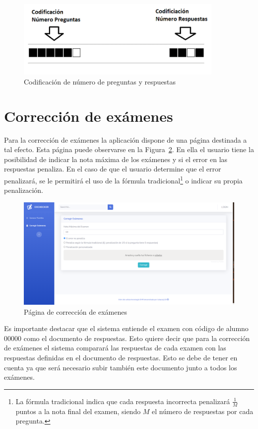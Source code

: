 \documentclass[a4paper, 12pt]{book}
\begin{document}
\begin{figure}
  \centering
  \includegraphics[width=10cm, keepaspectratio]{img/codificaciones}
  \caption{Codificación de número de preguntas y respuestas}
  \label{figura:codificaciones}
\end{figure}

\section{Corrección de exámenes} 
\label{sec:correccion_examenes}

Para la corrección de exámenes la aplicación dispone de una página destinada a tal
efecto. Esta página puede observarse en la Figura~\ref{figura:correccion_examenes}.
En ella el usuario tiene la posibilidad de indicar la nota máxima de los exámenes
y si el error en las respuestas penaliza. En el caso de que el usuario determine
que el error penalizará, se le permitirá el uso de la fórmula
tradicional\footnote{La fórmula tradicional indica que cada respuesta
incorrecta penalizará $\frac{1}{M}$ puntos a la nota final del examen,
siendo $M$ el número de respuestas por cada pregunta.} o indicar su propia penalización.

\begin{figure}
  \centering
  \includegraphics[width=12cm, keepaspectratio]{img/correccion_examenes}
  \caption{Página de corrección de exámenes}
  \label{figura:correccion_examenes}
\end{figure}

Es importante destacar que el sistema entiende el examen con código de alumno 00000
como el documento de respuestas. Esto quiere decir que para la corrección de
exámenes el sistema comparará las respuestas de cada examen con las respuestas
definidas en el documento de respuestas.
Esto se debe de tener en cuenta ya que será necesario
subir también este documento junto a todos los exámenes.
\end{document}

